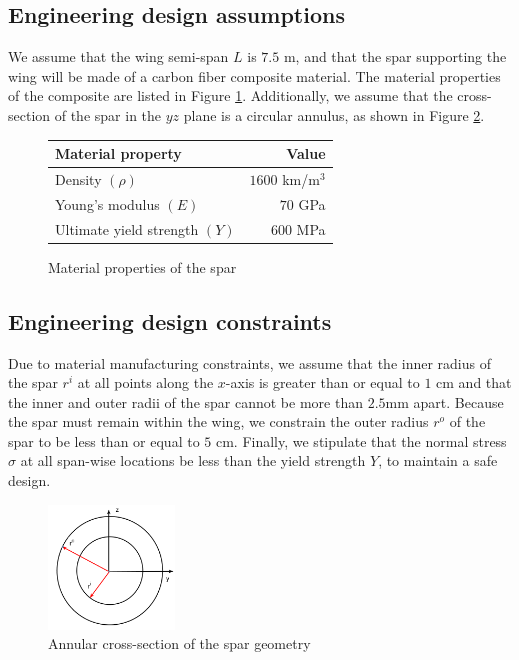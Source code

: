 \documentclass[11pt]{article}
\begin{document}
\subsection{Engineering design assumptions}

We assume that the wing semi-span $L$ is $7.5$ m,
and that the spar supporting the wing will be made
of a carbon fiber composite material. The material properties
of the composite are listed in Figure \ref{fig:materials}.
Additionally, we assume that the cross-section of
the spar in the $yz$ plane is a circular annulus,
as shown in Figure \ref{fig:annulus}.

\begin{figure}[hbt]
\centering
\begin{tabular}{ | l | r  |}
\hline
Material property & Value \\ \hline
Density $(\rho)$ & $1600$ km/m$^3$ \\ \hline
Young's modulus $(E)$ & $70$ GPa \\ \hline
Ultimate yield strength $(Y)$ & $600$ MPa \\ \hline
\end{tabular}
\caption{Material properties of the spar}
\label{fig:materials}
\end{figure}

\subsection{Engineering design constraints}

Due to material manufacturing constraints, we
assume that the inner radius of the spar $r^i$ at all
points along the $x$-axis is greater than or equal to $1$ cm
and that the inner and outer radii of the spar cannot be
more than $2.5$mm apart.
Because the spar must remain within the wing, we
constrain the outer radius $r^o$ of the spar to be less
than or equal to $5$ cm.
Finally, we stipulate that the normal stress $\sigma$ at all
span-wise locations be less than the yield
strength $Y$, to maintain a safe design.

\begin{figure}[hbt]
\centering
\includegraphics[width=0.3\textwidth]{annulus}
\caption{Annular cross-section of the spar geometry}
\label{fig:annulus}
\end{figure}
\end{document}
